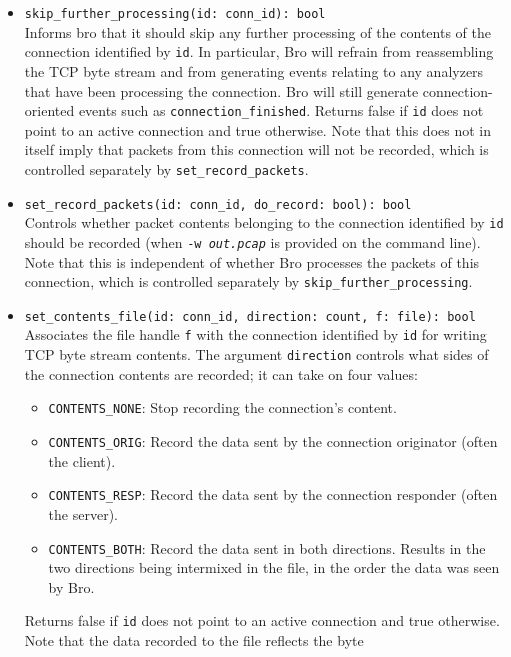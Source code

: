 \documentclass[10pt,landscape]{article}
\begin{document}
\begin{multicols*}{2}
\begin{itemize}
  \item \verb|skip_further_processing(id: conn_id): bool|\\
    Informs bro that it should skip any further processing of the contents of
    the connection identified by \verb|id|. In particular, Bro will refrain
    from reassembling the TCP byte stream and from generating events relating
    to any analyzers that have been processing the connection. Bro will still
    generate connection-oriented events such as \verb|connection_finished|.
    Returns false if \verb|id| does not point to an active connection and
    true otherwise. Note that this does not in itself imply that packets from
    this connection will not be recorded, which is controlled separately by
    \verb|set_record_packets|.
  \item \verb|set_record_packets(id: conn_id, do_record: bool): bool|\\
    Controls whether packet contents belonging to the connection identified by
    \verb|id| should be recorded (when \texttt{-w \textit{out.pcap}} is
    provided on the command line).
    Note that this is independent of whether Bro processes the packets of this
    connection, which is controlled separately by
    \verb|skip_further_processing|.
  \item \verb|set_contents_file(id: conn_id, direction: count, f: file): bool|\\
    Associates the file handle \verb|f| with the connection identified by
    \verb|id| for writing TCP byte stream contents. The argument
    \verb|direction| controls what sides of the connection contents are
    recorded; it can take on four values:
    \begin{itemize}
      \item \verb|CONTENTS_NONE|: Stop recording the connection's content.
      \item \verb|CONTENTS_ORIG|: Record the data sent by the connection
        originator (often the client).
      \item \verb|CONTENTS_RESP|: Record the data sent by the connection
        responder (often the server).
      \item \verb|CONTENTS_BOTH|: Record the data sent in both directions.
        Results in the two directions being intermixed in the file, in the
        order the data was seen by Bro.
    \end{itemize}
    Returns false if \verb|id| does not point to an active connection and
    true otherwise. Note that the data recorded to the file reflects the byte

\end{itemize}
\end{multicols*}
\end{document}
